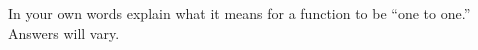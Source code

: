{In your own words explain what it means for a function to be ``one to one.''}
{Answers will vary.
}
